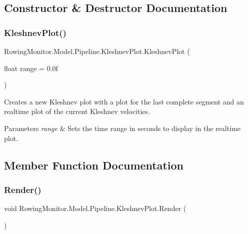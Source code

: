 \subsection{Constructor \& Destructor Documentation}
\mbox{\label{class_rowing_monitor_1_1_model_1_1_pipeline_1_1_kleshnev_plot_a892c72567b10ca5cd3ef48b4ad9adb6e}} 
\subsubsection{\texorpdfstring{Kleshnev\+Plot()}{KleshnevPlot()}}
{\footnotesize\ttfamily Rowing\+Monitor.\+Model.\+Pipeline.\+Kleshnev\+Plot.\+Kleshnev\+Plot (\begin{DoxyParamCaption}\item[{float}]{range = {\ttfamily 0.0f} }\end{DoxyParamCaption})}



Creates a new Kleshnev plot with a plot for the last complete segment and an realtime plot of the current Kleshnev velocities. 


\begin{DoxyParams}{Parameters}
{\em range} & Sets the time range in seconds to display in the realtime plot.\\
\hline
\end{DoxyParams}


\subsection{Member Function Documentation}
\mbox{\label{class_rowing_monitor_1_1_model_1_1_pipeline_1_1_kleshnev_plot_a879f9fed320882b414bee01067dbe904}} 
\subsubsection{\texorpdfstring{Render()}{Render()}}
{\footnotesize\ttfamily void Rowing\+Monitor.\+Model.\+Pipeline.\+Kleshnev\+Plot.\+Render (\begin{DoxyParamCaption}{ }\end{DoxyParamCaption})}



